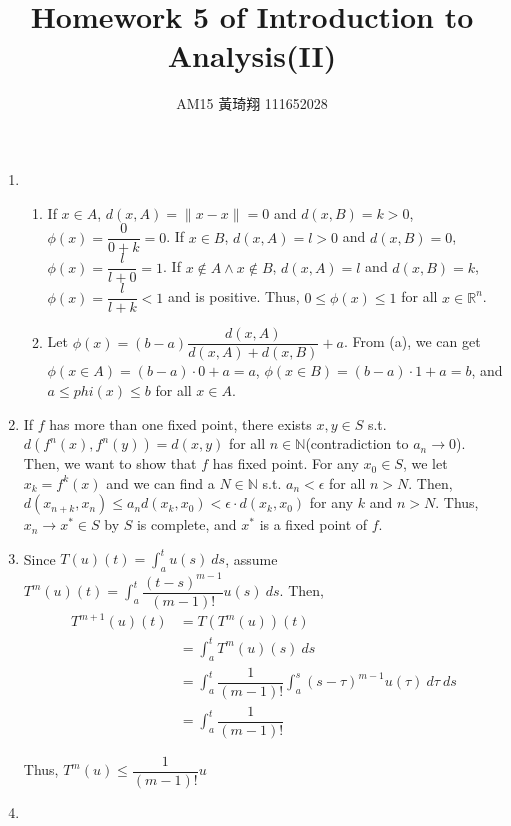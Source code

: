 \documentclass[12pt]{article}
\title{Homework 5 of Introduction to Analysis(II)}
\author{AM15 黃琦翔 111652028}
\begin{document}
\maketitle
\begin{enumerate}
    \item \begin{enumerate}
        \item If $x\in A$, $d(x, A) = \| x-x \| = 0$ and $d(x, B) = k > 0$, $\phi(x) = \dfrac{0}{0 + k} = 0$.
        If $x\in B$, $d(x, A) = l > 0$ and $d(x, B) = 0$, $\phi(x) = \dfrac{l}{l + 0} = 1$.
        If $x \notin A \wedge x \notin B$, $d(x, A) = l$ and $d(x, B) = k$, $\phi(x) = \dfrac{l}{l+k} < 1$ and is positive.
        Thus, $0 \leq \phi(x) \leq 1$ for all $x \in \mathbb{R}^n$.

        \item Let $\phi(x) = (b-a)\dfrac{d(x, A)}{d(x, A) + d(x, B)} + a$.
        From (a), we can get $\phi(x\in A) = (b-a)\cdot 0 + a = a$, $\phi(x\in B) = (b-a)\cdot 1 + a = b$,
        and $a \leq phi(x)\leq b$ for all $x\in A$.
    \end{enumerate}

    \item If $f$ has more than one fixed point, there exists $x, y\in S$ s.t. $d(f^n(x), f^n(y)) = d(x, y)$ for all $n\in\mathbb{N}$(contradiction to $a_n \to 0$).
    Then, we want to show that $f$ has fixed point.
    For any $x_0\in S$, we let $x_k = f^k(x)$ and we can find a $N\in\mathbb{N}$ s.t. $a_n < \epsilon$ for all $n > N$.
    Then, $d(x_{n+k}, x_n) \leq a_n d(x_k, x_0) < \epsilon\cdot d(x_k, x_0)$ for any $k$ and $n > N$.
    Thus, $x_n \to x^*\in S$ by $S$ is complete, and $x^*$ is a fixed point of $f$.

    \item Since $T(u)(t) = \displaystyle\int_a^t u(s)\ ds$, assume $T^m(u)(t) = \displaystyle\int_{a}^{t}\dfrac{(t-s)^{m-1}}{(m-1)!} u(s)\ ds$.
    Then, \begin{align*}
        T^{m+1}(u)(t) &= T(T^m(u))(t)\\
        &= \int_{a}^{t} T^m(u)(s)\ ds\\
        &= \int_{a}^{t} \dfrac{1}{(m-1)!}\int_{a}^{s} (s-\tau)^{m-1} u(\tau)\ d\tau\ ds\\
        &= \int_{a}^{t} \dfrac{1}{(m-1)!} 
    \end{align*}

    Thus, $T^m(u) \leq \dfrac{1}{(m-1)!}u$ 

    \item 
    
\end{enumerate}
\end{document}
